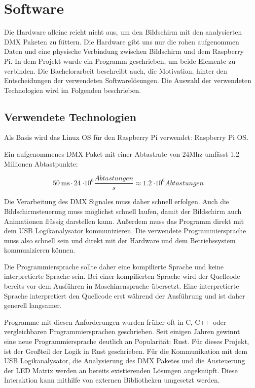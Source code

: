\chapter{Software}

Die Hardware alleine reicht nicht aus, um den Bildschirm mit den analysierten DMX Paketen zu füttern. Die Hardware gibt uns nur die rohen aufgenommen Daten und eine physische Verbindung zwischen Bildschirm und dem Raspberry Pi. In dem Projekt wurde ein Programm geschrieben, um beide Elemente zu verbinden. Die Bachelorarbeit beschreibt auch, die Motivation, hinter den Entscheidungen der verwendeten Softwarelösungen. Die Auswahl der verwendeten Technologien wird im Folgenden beschrieben.

\section{Verwendete Technologien}
Als Basis wird das Linux OS für den Raspberry Pi verwendet: Raspberry Pi OS.

Ein aufgenommenes DMX Paket mit einer Abtastrate von 24Mhz umfässt 1.2 Millionen Abtastpunkte:

\[\SI{50}{\ms} \cdot \SI{24}{\cdot 10^6 \frac{Abtastungen}{s}} \approx \SI{1.2}{\cdot 10^6 Abtastungen}\]

Die Verarbeitung des DMX Signales muss daher schnell erfolgen. Auch die Bildschirmsteuerung muss möglichst schnell laufen, damit der Bildschirm auch Animationen flüssig darstellen kann. Außerdem muss das Programm direkt mit dem USB Logikanalysator kommunizieren. Die verwendete Programmiersprache muss also schnell sein und direkt mit der Hardware und dem Betriebssystem kommunizieren können.

Die Programmiersprache sollte daher eine kompilierte Sprache und keine interpretierte Sprache sein. Bei einer kompilierten Sprache wird der Quellcode bereits vor dem Ausführen in Maschinensprache übersetzt. Eine interpretierte Sprache interpretiert den Quellcode erst während der Ausführung und ist daher generell langsamer.

Programme mit diesen Anforderungen wurden früher oft in C, C++ oder vergleichbaren Programmiersprachen geschrieben. Seit einigen Jahren gewinnt eine neue Programmiersprache deutlich an Popularität: Rust. Für dieses Projekt, ist der Großteil der Logik in Rust geschrieben.
Für die Kommunikation mit dem USB Logikanalysator, die Analysierung des DMX Paketes und die Ansteuerung der LED Matrix werden an bereits existierenden Lösungen angeknüpft. Diese Interaktion kann mithilfe von externen Bibliotheken umgesetzt werden.

